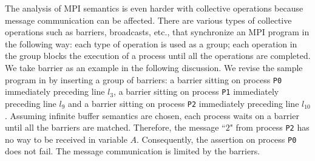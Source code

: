 
The analysis of MPI semantics is even harder with collective operations because message communication can be affected. There are various types of collective operations such as barriers, broadcasts, etc., that synchronize an MPI program in the following way: each type of operation is used as a group; each operation in the group blocks the execution of a process until all the operations are completed. We take barrier as an example in the following discussion. We revise the sample program in  by inserting a group of barriers: a barrier sitting on process \texttt{P0} immediately preceding line $l_3$, a barrier sitting on process \texttt{P1} immediately preceding line $l_9$ and a barrier sitting on process \texttt{P2} immediately preceding line $l_{10}$. Assuming infinite buffer semantics are chosen, each process waits on a barrier until all the barriers are matched. Therefore, the message ``$2$" from process \texttt{P2} has no way to be received in variable $A$. Consequently, the assertion on process \texttt{P0} does not fail. The message communication is limited by the barriers. 





